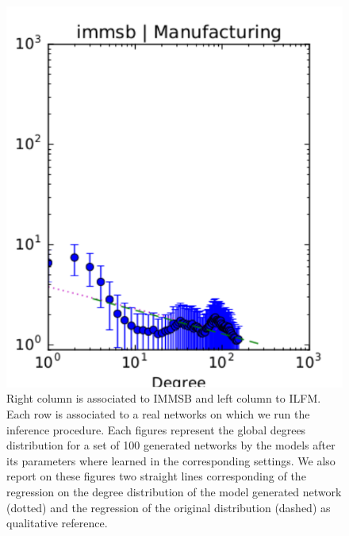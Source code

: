 \begin{figure}[h]
	\endminipage
	\includegraphics[scale=0.4]{img/immsb_manufacturing_d}
	\endminipage
	
	\caption{Right column is associated to IMMSB and left column to ILFM. Each row is associated to a real networks on which we run the inference procedure. Each figures represent the global degrees distribution for a set of 100 generated networks by the models after its parameters where learned in the corresponding settings. We also report on these figures two straight lines corresponding of the regression on the degree distribution of the model generated network (dotted) and the regression of the original distribution (dashed) as qualitative reference.}
	\label{fig:gen_graph_r}
\end{figure}


